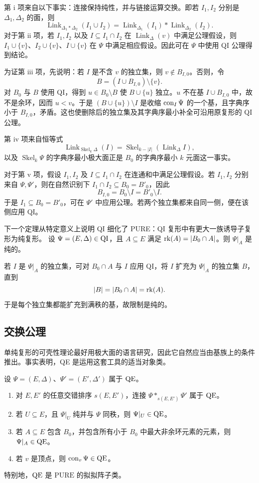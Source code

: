 \begin{proofcn}
第 i 项来自以下事实：连接保持纯性，并与链接运算交换。即若 $I_1,I_2$ 分别是 $\Delta_1,\Delta_2$ 的面，则
\[
\operatorname{Link}_{\Delta_1*\Delta_2}(I_1\cup I_2)
=\operatorname{Link}_{\Delta_1}(I_1)*\operatorname{Link}_{\Delta_2}(I_2).
\]
对于第 ii 项，若 $I_1,I_2$ 以及 $I\subseteq I_1\cap I_2$ 在 $\operatorname{Link}_\Delta(v)$ 中满足公理假设，则 $I_1\cup\{v\}$、$I_2\cup\{v\}$、$I\cup\{v\}$ 在 $\Psi$ 中满足相应假设。因此可在 $\Psi$ 中使用 QI 公理得到结论。

为证第 iii 项，先说明：若 $I$ 是不含 $v$ 的独立集，则 $v\notin B_{I,0}$。否则，令
\[
B=(I\cup B_{I,0})\setminus\{v\}.
\]
对 $B_0$ 与 $B$ 使用 QI，得到 $u\in B_0\setminus B$ 使 $B\cup\{u\}$ 独立。$u$ 不在基 $I\cup B_{I,0}$ 中，故不是余环，因而 $u<v$。于是 $(B\cup\{u\})\setminus I$ 是收缩 $\operatorname{con}_I\Psi$ 的一个基，且字典序小于 $B_{I,0}$，矛盾。这也使删除后的独立集及其字典序最小补全可沿用原复形的 QI 公理。

第 iv 项来自恒等式
\[
\operatorname{Link}_{\operatorname{Skel}_k\Delta}(I)
=\operatorname{Skel}_{k-|I|}(\operatorname{Link}_\Delta I),
\]
以及 $\operatorname{Skel}_k\Psi$ 的字典序最小极大面正是 $B_0$ 的字典序最小 $k$ 元面这一事实。

对于第 v 项，假设 $I_1,I_2$ 及 $I\subseteq I_1\cap I_2$ 在连通和中满足公理假设。若 $I_1,I_2$ 分别来自 $\Psi,\Psi'$，则在自然识别下 $I_1\cap I_2\subseteq B_0=B'_0$，因此
\[
B_{I,0}=B_0\setminus I=B'_0\setminus I.
\]
于是 $I_1\subseteq B_0=B'_0$，可在 $\Psi'$ 中应用公理。若两个独立集都来自同一侧，便在该侧应用 QI。
\end{proofcn}

下一个定理从特定意义上说明 QI 细化了 PURE：QI 复形中有更大一族诱导子复形为纯复形。
设 $\Psi=(E,\Delta)\in\mathrm{QI}$，且 $A\subseteq E$ 满足 $\operatorname{rk}(A)=|B_0\cap A|$。则 $\Psi|_A$ 是纯的。
\begin{proofcn}
若 $I$ 是 $\Psi|_A$ 的独立集，可对 $B_0\cap A$ 与 $I$ 应用 QI，将 $I$ 扩充为 $\Psi|_A$ 的独立集 $B$，直到
\[
|B|=|B_0\cap A|=\operatorname{rk}(A).
\]
于是每个独立集都能扩充到满秩的基，故限制是纯的。
\end{proofcn}

\subsection{交换公理}
单纯复形的可壳性理论最好用极大面的语言研究，因此它自然应当由基族上的条件推出。事实表明，QE 是运用这套工具的适当对象类。

设 $\Psi=(E,\Delta)$、$\Psi'=(E',\Delta')$ 属于 $\mathrm{QE}$。
\begin{enumerate}[label=\roman*.]
\item 对 $E,E'$ 的任意交错排序 $s(E,E')$，连接 $\Psi*_{s(E,E')}\Psi'$ 属于 $\mathrm{QE}$。
\item 若 $U\subseteq E$，且 $\Psi|_U$ 纯并与 $\Psi$ 同秩，则 $\Psi|_U\in\mathrm{QE}$。
\item 若 $A\subseteq E$ 包含 $B_0$，并包含所有小于 $B_0$ 中最大非余环元素的元素，则 $\Psi|_A\in\mathrm{QE}$。
\item 若 $v$ 是顶点，则 $\operatorname{con}_v\Psi\in\mathrm{QE}$。
\end{enumerate}
特别地，$\mathrm{QE}$ 是 $\mathrm{PURE}$ 的拟拟阵子类。

